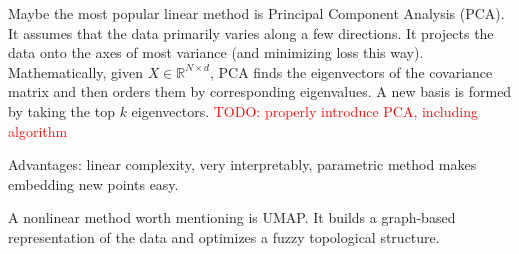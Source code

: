 Maybe the most popular linear method is Principal Component Analysis (PCA). It assumes that the data primarily varies along a few directions. It projects the data onto the axes of most variance (and minimizing loss this way). Mathematically, given $X \in \mathbb{R}^{N \times d}$, PCA finds the eigenvectors of the covariance matrix and then orders them by corresponding eigenvalues. A new basis is formed by taking the top $k$ eigenvectors. 
\textcolor{red}{TODO: properly introduce PCA, including algorithm}

Advantages: linear complexity, very interpretably, parametric method makes embedding new points easy. 

A nonlinear method worth mentioning is UMAP. It builds a graph-based representation of the data and optimizes a fuzzy topological structure. 